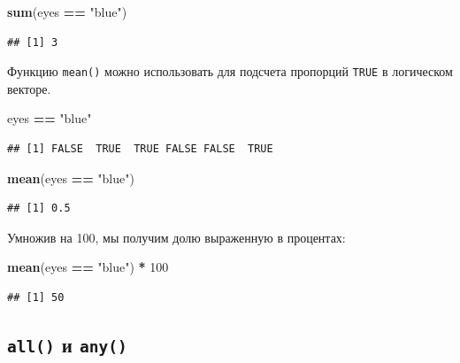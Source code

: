 \documentclass[]{book}
\newenvironment{Shaded}{\begin{snugshade}}{\end{snugshade}}
\newcommand{\KeywordTok}[1]{\textcolor[rgb]{0.13,0.29,0.53}{\textbf{#1}}}
\newcommand{\DecValTok}[1]{\textcolor[rgb]{0.00,0.00,0.81}{#1}}
\newcommand{\StringTok}[1]{\textcolor[rgb]{0.31,0.60,0.02}{#1}}
\newcommand{\OperatorTok}[1]{\textcolor[rgb]{0.81,0.36,0.00}{\textbf{#1}}}
\newcommand{\NormalTok}[1]{#1}
\begin{document}
\begin{Shaded}
\begin{Highlighting}[]
\KeywordTok{sum}\NormalTok{(eyes }\OperatorTok{==}\StringTok{ "blue"}\NormalTok{)}
\end{Highlighting}
\end{Shaded}

\begin{verbatim}
## [1] 3
\end{verbatim}

Функцию \texttt{mean()} можно использовать для подсчета пропорций
\texttt{TRUE} в логическом векторе.

\begin{Shaded}
\begin{Highlighting}[]
\NormalTok{eyes }\OperatorTok{==}\StringTok{ "blue"}
\end{Highlighting}
\end{Shaded}

\begin{verbatim}
## [1] FALSE  TRUE  TRUE FALSE FALSE  TRUE
\end{verbatim}

\begin{Shaded}
\begin{Highlighting}[]
\KeywordTok{mean}\NormalTok{(eyes }\OperatorTok{==}\StringTok{ "blue"}\NormalTok{)}
\end{Highlighting}
\end{Shaded}

\begin{verbatim}
## [1] 0.5
\end{verbatim}

Умножив на 100, мы получим долю выраженную в процентах:

\begin{Shaded}
\begin{Highlighting}[]
\KeywordTok{mean}\NormalTok{(eyes }\OperatorTok{==}\StringTok{ "blue"}\NormalTok{) }\OperatorTok{*}\StringTok{ }\DecValTok{100}
\end{Highlighting}
\end{Shaded}

\begin{verbatim}
## [1] 50
\end{verbatim}

\subsection{\texorpdfstring{\texttt{all()} и
\texttt{any()}}{all() и any()}}\label{all_any}
\end{document}
